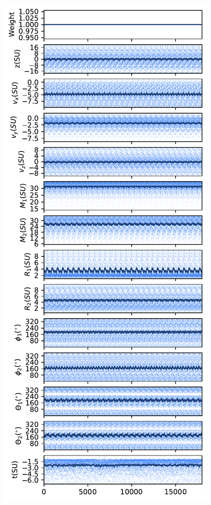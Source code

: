 \begin{figure}
    \centering
    \includegraphics[width=\textwidth]{Chapter1/figures/arp-240-steps.pdf}

\end{figure}
